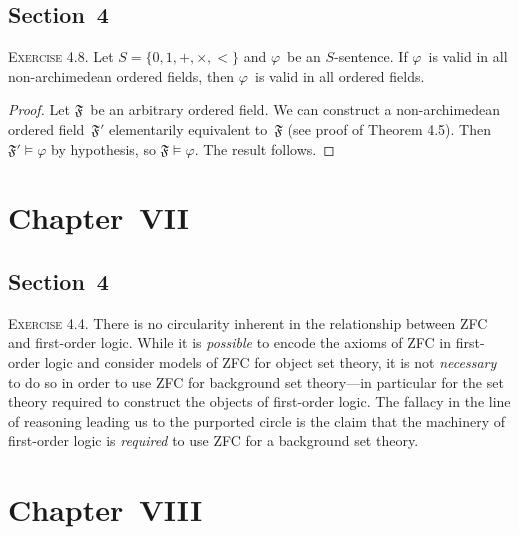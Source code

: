 \documentclass[letterpaper]{article}
\newcommand{\F}{\mathfrak{F}}
\theoremstyle{remark}
\begin{document}
\subsection*{Section~4}
\noindent\textsc{Exercise 4.8.}
Let $S=\{0,1,+,\times,<\}$ and $\varphi$~be an $S$-sentence. If $\varphi$~is valid in all non-archimedean ordered fields, then $\varphi$~is valid in all ordered fields.
\begin{proof}
Let $\F$~be an arbitrary ordered field. We can construct a non-archimedean ordered field~$\F'$ elementarily equivalent to~$\F$ (see proof of Theorem 4.5). Then $\F'\models\varphi$ by hypothesis, so $\F\models\varphi$. The result follows.
\end{proof}

\section*{Chapter~VII}
\subsection*{Section~4}
\noindent\textsc{Exercise 4.4.}
There is no circularity inherent in the relationship between ZFC and first-order logic. While it is \emph{possible} to encode the axioms of ZFC in first-order logic and consider models of ZFC for object set theory, it is not \emph{necessary} to do so in order to use ZFC for background set theory---in particular for the set theory required to construct the objects of first-order logic. The fallacy in the line of reasoning leading us to the purported circle is the claim that the machinery of first-order logic is \emph{required} to use ZFC for a background set theory.

\section*{Chapter~VIII}
\end{document}

